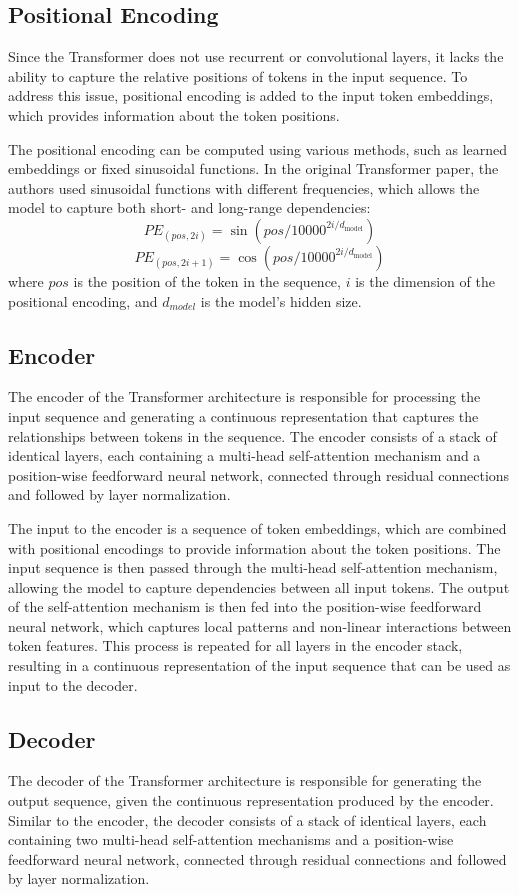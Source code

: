 \documentclass[12pt]{article}
\begin{document}
\subsection{Positional Encoding}

Since the Transformer does not use recurrent or convolutional layers, it lacks the ability to capture the relative positions of tokens in the input sequence. To address this issue, positional encoding is added to the input token embeddings, which provides information about the token positions.

The positional encoding can be computed using various methods, such as learned embeddings or fixed sinusoidal functions. In the original Transformer paper, the authors used sinusoidal functions with different frequencies, which allows the model to capture both short- and long-range dependencies:
$$ PE_{(pos, 2i)} = \sin(pos / 10000^{2i/d_{\text{model}}})$$
$$PE_{(pos, 2i+1)} = \cos(pos / 10000^{2i/d_{\text{model}}})$$
where $pos$ is the position of the token in the sequence, $i$ is the dimension of the positional encoding, and $d_{model}$ is the model's hidden size.

\subsection{Encoder}
The encoder of the Transformer architecture is responsible for processing the input sequence and generating a continuous representation that captures the relationships between tokens in the sequence. The encoder consists of a stack of identical layers, each containing a multi-head self-attention mechanism and a position-wise feedforward neural network, connected through residual connections and followed by layer normalization.

The input to the encoder is a sequence of token embeddings, which are combined with positional encodings to provide information about the token positions. The input sequence is then passed through the multi-head self-attention mechanism, allowing the model to capture dependencies between all input tokens. The output of the self-attention mechanism is then fed into the position-wise feedforward neural network, which captures local patterns and non-linear interactions between token features. This process is repeated for all layers in the encoder stack, resulting in a continuous representation of the input sequence that can be used as input to the decoder.

\subsection{Decoder}
The decoder of the Transformer architecture is responsible for generating the output sequence, given the continuous representation produced by the encoder. Similar to the encoder, the decoder consists of a stack of identical layers, each containing two multi-head self-attention mechanisms and a position-wise feedforward neural network, connected through residual connections and followed by layer normalization.
\end{document}
